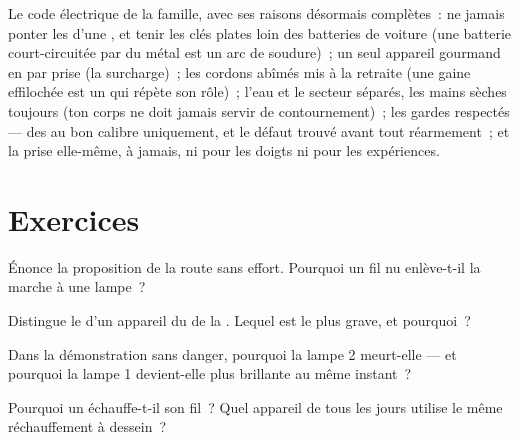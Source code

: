 \begin{remark}\label{rem:g7:short-circuits-safety:rules}
Le code électrique de la famille, avec ses raisons désormais
complètes~: ne jamais ponter les  d'une , et tenir les clés
plates loin des batteries de voiture (une batterie court-circuitée
par du métal est un arc de soudure)~; un seul appareil gourmand en
 par prise (la surcharge)~; les cordons abîmés mis à la
retraite (une gaine effilochée est un  qui répète son
rôle)~; l'eau et le secteur séparés, les mains sèches toujours (ton
corps ne doit jamais servir de contournement)~; les gardes respectés
--- des  au bon calibre uniquement, et le défaut trouvé avant
tout réarmement~; et la prise elle-même, à jamais, ni pour les doigts
ni pour les expériences.
\end{remark}

\section{Exercices}

\begin{exercise}[$\star$]\label{exo:g7:short-circuits-safety:1}
Énonce la proposition de la route sans effort. Pourquoi un fil nu
enlève-t-il la marche à une lampe~?
\end{exercise}

\begin{exercise}[$\star$]\label{exo:g7:short-circuits-safety:2}
Distingue le  d'un appareil du  de la .
Lequel est le plus grave, et pourquoi~?
\end{exercise}

\begin{exercise}[$\star$]\label{exo:g7:short-circuits-safety:3}
Dans la démonstration sans danger, pourquoi la lampe 2 meurt-elle ---
et pourquoi la lampe 1 devient-elle plus brillante au même instant~?
\end{exercise}

\begin{exercise}[$\star$]\label{exo:g7:short-circuits-safety:4}
Pourquoi un  échauffe-t-il son fil~? Quel appareil de
tous les jours utilise le même réchauffement à dessein~?
\end{exercise}

